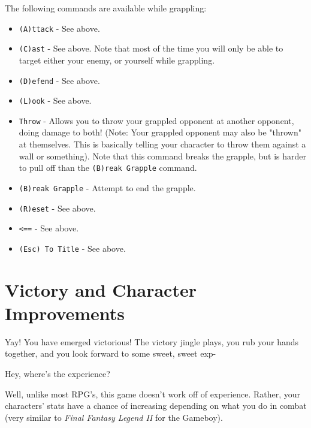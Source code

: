 \documentclass{report}
\begin{document}
\begin{itemize}
\begin{itemize}
The following commands are available while grappling:
\begin{itemize}
    \item \verb|(A)ttack| - See above.
    \item \verb|(C)ast| - See above. Note that most of the time you will only
    be able to target either your enemy, or yourself while grappling.
    \item \verb|(D)efend| - See above.
    \item \verb|(L)ook| - See above.
    \item \verb|Throw| - Allows you to throw your grappled opponent at another
    opponent, doing damage to both! (Note: Your grappled opponent may also be "thrown" at
    themselves. This is basically telling your character to throw them against
    a wall or something). Note that this command breaks the grapple, but is harder
    to pull off than the \verb|(B)reak Grapple| command.
    \item \verb|(B)reak Grapple| - Attempt to end the grapple.
    \item \verb|(R)eset| -  See above.
    \item {\color{green!50!black} \texttt{<==}} - See above.
    \item \verb|(Esc) To Title| - See above.
\end{itemize}

\section{Victory and Character Improvements}
Yay! You have emerged victorious! The victory jingle plays, you rub your hands
together, and you look forward to some sweet, sweet exp-

Hey, where's the experience?

Well, unlike most RPG's, this game doesn't work off of experience. Rather, your
characters' stats have a chance of increasing depending on what you do in 
combat (very similar to \textit{Final Fantasy Legend II} for the Gameboy).


\end{itemize}
\end{itemize}
\end{document}
